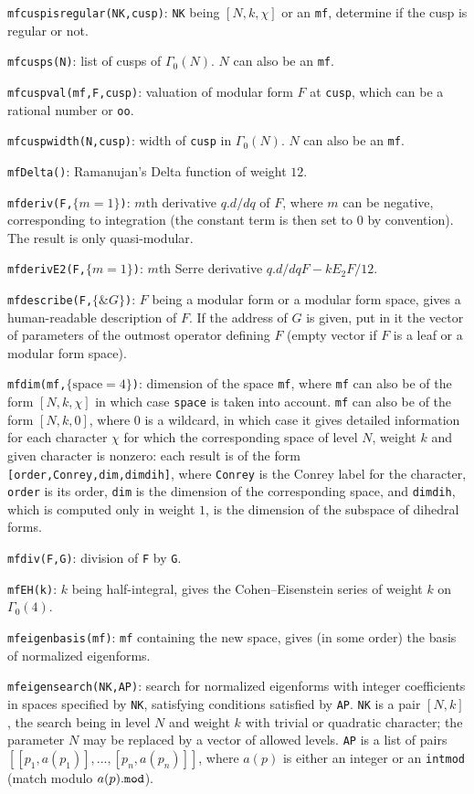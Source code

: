\documentclass[11pt]{article}
\newcommand{\G}{\Gamma}
\def\kbd#1{{\tt #1}}
\begin{document}
\f\kbd{mfcuspisregular(NK,cusp)}: \kbd{NK} being $[N,k,\chi]$ or an \kbd{mf},
determine if the cusp is regular or not.

\f\kbd{mfcusps(N)}: list of cusps of $\G_0(N)$. $N$ can also be an \kbd{mf}.

\f\kbd{mfcuspval(mf,F,cusp)}: valuation of modular form $F$ at \kbd{cusp}, which
can be a rational number or \kbd{oo}.

\f\kbd{mfcuspwidth(N,cusp)}: width of \kbd{cusp} in $\G_0(N)$. $N$ can also be
an \kbd{mf}.

\f\kbd{mfDelta()}: Ramanujan's Delta function of weight $12$.

\f\kbd{mfderiv(F,$\{m=1\}$)}: $m$th derivative $q.d/dq$ of $F$, where
$m$ can be negative, corresponding to integration (the constant term
is then set to $0$ by convention). The result is only quasi-modular.

\f\kbd{mfderivE2(F,$\{m=1\}$)}: $m$th Serre derivative $q.d/dq F-kE_2F/12$.

\f\kbd{mfdescribe(F,$\{\&G\}$)}: $F$ being a modular form or a modular form
space, gives a human-readable description of $F$. If the address of $G$ is
given, put in it the vector of parameters of the outmost operator defining
$F$ (empty vector if $F$ is a leaf or a modular form space).

\f\kbd{mfdim(mf,$\{\text{space}=4\}$)}: dimension of the space \kbd{mf},
where \kbd{mf} can also be of the form $[N,k,\chi]$ in which case \kbd{space}
is taken into account. \kbd{mf} can also be of the form $[N,k,0]$, where $0$
is a wildcard, in which case it gives detailed information for each character
$\chi$ for which the corresponding space of level $N$, weight $k$ and given
character is nonzero: each result is of the form
\kbd{[order,Conrey,dim,dimdih]}, where \kbd{Conrey} is the Conrey label for
the character, \kbd{order} is its order, \kbd{dim} is the dimension of the
corresponding space, and \kbd{dimdih}, which is computed only in weight $1$,
is the dimension of the subspace of dihedral forms.

\f\kbd{mfdiv(F,G)}: division of \kbd{F} by \kbd{G}.

\f\kbd{mfEH(k)}: $k$ being half-integral, gives the Cohen--Eisenstein series
of weight $k$ on $\G_0(4)$.

\f\kbd{mfeigenbasis(mf)}: \kbd{mf} containing the new space, gives
(in some order) the basis of normalized eigenforms.

\f\kbd{mfeigensearch(NK,AP)}: search for normalized eigenforms with
integer coefficients in spaces specified by \kbd{NK}, satisfying conditions
satisfied by \kbd{AP}. \kbd{NK} is a pair $[N,k]$, the search being in
level $N$ and weight $k$ with trivial or quadratic character; the parameter
$N$ may be replaced by a vector of allowed levels. \kbd{AP} is a list of pairs
$[[p_1,a(p_1)],...,[p_n,a(p_n)]]$, where $a(p)$ is either an integer or an
\kbd{intmod} (match modulo $a(p)\kbd{.mod}$).
\end{document}
